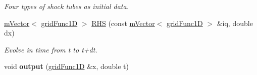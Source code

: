 \begin{DoxyCompactItemize}
\begin{DoxyCompactList}\small\item\em Four types of shock tubes as initial data. \end{DoxyCompactList}\item 
\hyperlink{classmVector}{m\+Vector}$<$ \hyperlink{classgridFunc1D}{grid\+Func1D} $>$ \hyperlink{classEuler1D_a466e76f0be22e407e3b17072fb567fb4}{R\+HS} (const \hyperlink{classmVector}{m\+Vector}$<$ \hyperlink{classgridFunc1D}{grid\+Func1D} $>$ \&iq, double dx)
\begin{DoxyCompactList}\small\item\em Evolve in time from t to t+dt. \end{DoxyCompactList}\item 
\mbox{\label{classEuler1D_a994704a8f516533966aa368bc6b34682}} 
void {\bfseries output} (\hyperlink{classgridFunc1D}{grid\+Func1D} \&x, double t)
\end{DoxyCompactItemize}
